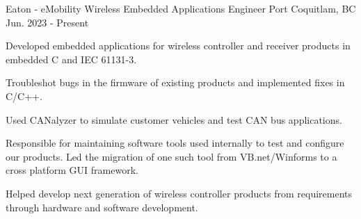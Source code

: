 


\begin{cventries}
    \cventry
    {Eaton - eMobility Wireless} %
    {Embedded Applications Engineer} %
    {Port Coquitlam, BC} %
    {Jun. 2023 - Present} %
    { %
        \begin{cvitems}
            \item {Developed embedded applications for wireless controller and receiver products in embedded C and IEC 61131-3.}
            \item {Troubleshot bugs in the firmware of existing products and implemented fixes in C/C++.}
            \item {Used CANalyzer to simulate customer vehicles and test CAN bus applications. }
            \item {Responsible for maintaining software tools used internally to test and configure our products. Led the migration of one such tool from VB.net/Winforms to a cross platform GUI framework.}
            \item {Helped develop next generation of wireless controller products from requirements through hardware and software development.}
        \end{cvitems}
    }


\end{cventries}

